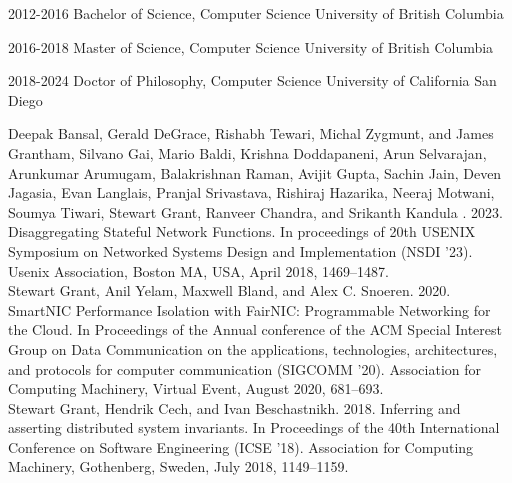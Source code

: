 \documentclass[12pt]{ucsddissertation}
\begin{document}
\begin{vita}
\noindent
\begin{cv}{}
\begin{cvlist}{}
\item[2012-2016] Bachelor of Science, Computer Science University of British Columbia
\item[2016-2018] Master of Science, Computer Science University of British Columbia
\item[2018-2024] Doctor of Philosophy, Computer Science University of California San Diego
\end{cvlist}
\end{cv}

\publications

\noindent Deepak Bansal, Gerald DeGrace, Rishabh Tewari, Michal Zygmunt, and James Grantham, Silvano
Gai, Mario Baldi, Krishna Doddapaneni, Arun Selvarajan, Arunkumar Arumugam, Balakrishnan Raman,
Avijit Gupta, Sachin Jain, Deven Jagasia, Evan Langlais, Pranjal Srivastava, Rishiraj Hazarika,
Neeraj Motwani, Soumya Tiwari, Stewart Grant, Ranveer Chandra, and Srikanth Kandula . 2023.
Disaggregating Stateful Network Functions. In proceedings of 20th USENIX Symposium on Networked
Systems Design and Implementation (NSDI '23).  Usenix Association, Boston MA, USA, April 2018, 1469--1487. \\

\noindent Stewart Grant, Anil Yelam, Maxwell Bland, and Alex C. Snoeren. 2020. SmartNIC Performance
Isolation with FairNIC: Programmable Networking for the Cloud. In Proceedings of the Annual
conference of the ACM Special Interest Group on Data Communication on the applications,
technologies, architectures, and protocols for computer communication (SIGCOMM '20). Association for
Computing Machinery, Virtual Event, August 2020, 681–693.\\

\noindent Stewart Grant, Hendrik Cech, and Ivan Beschastnikh. 2018. Inferring and asserting
distributed system invariants. In Proceedings of the 40th International Conference on Software
Engineering (ICSE '18). Association for Computing Machinery, Gothenberg, Sweden, July 2018, 1149–1159.\\


\end{vita}
\end{document}
